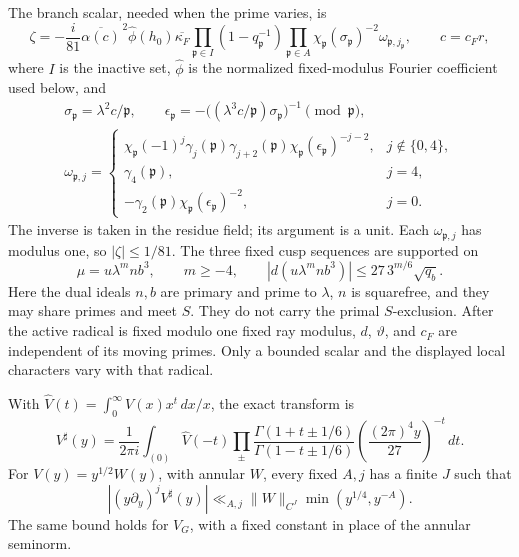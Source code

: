 \documentclass[11pt,a4paper]{article}
\begin{document}
The branch scalar, needed when the prime varies, is \[
\zeta=-\frac{i}{81}\overline{\alpha(c)}^{\,2}\widehat\phi(h_0)
\overline{\kappa_F}
\prod_{\mathfrak p\in I}(1-q_{\mathfrak p}^{-1})
\prod_{\mathfrak p\in A}\chi_{\mathfrak p}(\sigma_{\mathfrak p})^{-2}
\omega_{\mathfrak p,j_{\mathfrak p}},\qquad c=c_Fr,
\tag{B.4}\label{eq:B.4}
\] where \(I\) is the inactive set, \(\widehat\phi\) is the normalized fixed-modulus Fourier coefficient used below, and \[
\begin{gathered}
\sigma_{\mathfrak p}=\lambda^2c/\mathfrak p,\qquad
\epsilon_{\mathfrak p}=-\bigl((\lambda^3c/\mathfrak p)\sigma_{\mathfrak p}\bigr)^{-1}
\pmod{\mathfrak p},\\
\omega_{\mathfrak p,j}=
\begin{cases}
\chi_{\mathfrak p}(-1)^j\gamma_j(\mathfrak p)\gamma_{j+2}(\mathfrak p)
\chi_{\mathfrak p}(\epsilon_{\mathfrak p})^{-j-2},&j\notin\{0,4\},\\
\gamma_4(\mathfrak p),&j=4,\\
-\gamma_2(\mathfrak p)\chi_{\mathfrak p}(\epsilon_{\mathfrak p})^{-2},&j=0.
\end{cases}
\end{gathered}
\] The inverse is taken in the residue field; its argument is a unit. Each \(\omega_{\mathfrak p,j}\) has modulus one, so \(|\zeta|\le1/81\). The three fixed cusp sequences are supported on \[
\mu=u\lambda^mnb^3,\qquad m\ge-4,
\qquad |d(u\lambda^mnb^3)|\le27\,3^{m/6}\sqrt{q_b}.
\tag{B.5}\label{eq:B.5}
\] Here the dual ideals \(n,b\) are primary and prime to \(\lambda\), \(n\) is squarefree, and they may share primes and meet \(S\). They do not carry the primal \(S\)-exclusion. After the active radical is fixed modulo one fixed ray modulus, \(d\), \(\vartheta\), and \(c_F\) are independent of its moving primes. Only a bounded scalar and the displayed local characters vary with that radical.

With \(\widehat V(t)=\int_0^\infty V(x)x^t\,dx/x\), the exact transform is \[
V^\sharp(y)=\frac1{2\pi i}\int_{(0)}\widehat V(-t)
\prod_{\pm}\frac{\Gamma(1+t\pm1/6)}{\Gamma(1-t\pm1/6)}
\left(\frac{(2\pi)^4y}{27}\right)^{-t}\,dt.
\tag{B.6}\label{eq:B.6}
\] For \(V(y)=y^{1/2}W(y)\), with annular \(W\), every fixed \(A,j\) has a finite \(J\) such that \[
|(y\partial_y)^jV^\sharp(y)|
\ll_{A,j}\|W\|_{C^J}\min(y^{1/4},y^{-A}).
\tag{B.7}\label{eq:B.7}
\] The same bound holds for \(V_G\), with a fixed constant in place of the annular seminorm.
\end{document}
